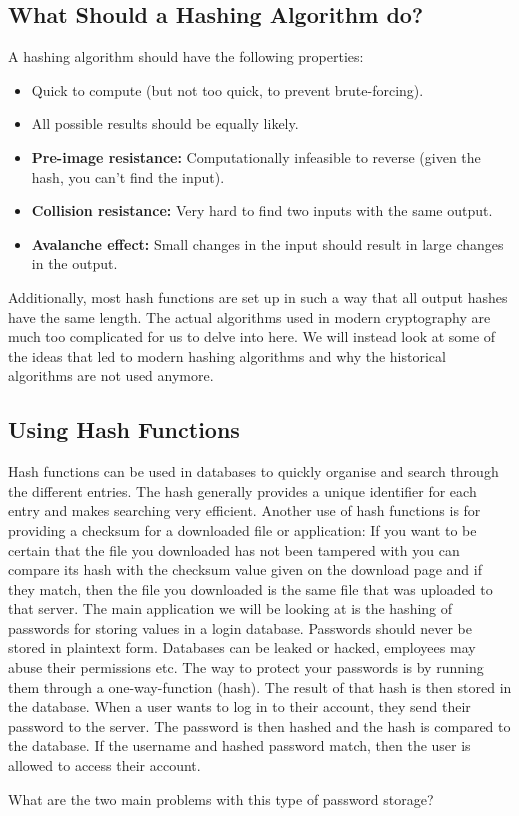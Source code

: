 \documentclass[11pt,a4paper]{report}
\begin{document}
\subsection{What Should a Hashing Algorithm do?}

A hashing algorithm should have the following properties:
\begin{itemize}
\item Quick to compute (but not too quick, to prevent brute-forcing).
\item All possible results should be equally likely.
\item \textbf{Pre-image resistance:} Computationally infeasible to reverse (given the hash, you can't find the input).
\item \textbf{Collision resistance:} Very hard to find two inputs with the same output.
\item \textbf{Avalanche effect:} Small changes in the input should result in large changes in the output.
\end{itemize}

Additionally, most hash functions are set up in such a way that all output hashes have the same length.
The actual algorithms used in modern cryptography are much too complicated for us to delve into here.
We will instead look at some of the ideas that led to modern hashing algorithms and why the historical algorithms are not used anymore.

\subsection{Using Hash Functions}

Hash functions can be used in databases to quickly organise and search through the different entries.
The hash generally provides a unique identifier for each entry and makes searching very efficient.
Another use of hash functions is for providing a checksum for a downloaded file or application: If you want to be certain that the file you downloaded has not been tampered with you can compare its hash with the checksum value given on the download page and if they match, then the file you downloaded is the same file that was uploaded to that server.
The main application we will be looking at is the hashing of passwords for storing values in a login database.
Passwords should never be stored in plaintext form. Databases can be leaked or hacked, employees may abuse their permissions etc. The way to protect your passwords is by running them through a one-way-function (hash).
The result of that hash is then stored in the database.
When a user wants to log in to their account, they send their password to the server.
The password is then hashed and the hash is compared to the database.
If the username and hashed password match, then the user is allowed to access their account.
\begin{ex}
What are the two main problems with this type of password storage?
\end{ex}
\end{document}

